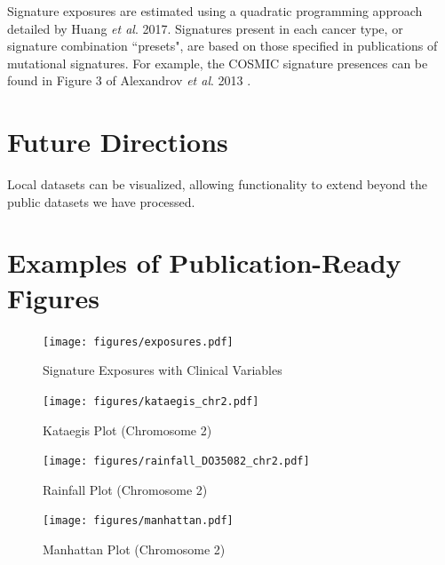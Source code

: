 \documentclass[12pt, letterpaper]{article}
\begin{document}
Signature exposures are estimated using a quadratic programming approach detailed by Huang \textit{et al}. 2017\cite{huang2017detecting}.
Signatures present in each cancer type, or signature combination ``presets", are based on those specified in publications of mutational signatures.
For example, the COSMIC signature presences can be found in Figure 3 of Alexandrov \textit{et al}. 2013 \cite{alexandrov2013signatures}.

\section{Future Directions}
Local datasets can be visualized, allowing functionality to extend beyond the public datasets we have processed.


{}


\pagebreak
\appendix                                     
\section{Examples of Publication-Ready Figures}
\renewcommand{\figurename}{Example Figure}
\setcounter{figure}{0}

\begin{figure}[h!]
    \caption{Signature Exposures with Clinical Variables}
    \centering
    \texttt{[image: figures/exposures.pdf]}
\end{figure}
\begin{figure}[h!]
    \caption{Kataegis Plot (Chromosome 2)}
    \centering
    \texttt{[image: figures/kataegis\_chr2.pdf]}
\end{figure}
\begin{figure}[h!]
    \caption{Rainfall Plot (Chromosome 2)}
    \centering
    \texttt{[image: figures/rainfall\_DO35082\_chr2.pdf]}
\end{figure}
\begin{figure}[h!]
    \caption{Manhattan Plot (Chromosome 2)}
    \centering
    \texttt{[image: figures/manhattan.pdf]}
\end{figure}
\end{document}
